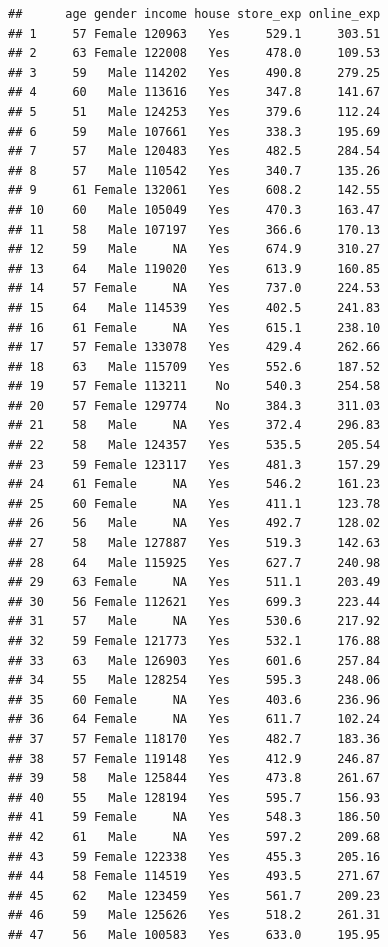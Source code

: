 \documentclass[12pt,]{krantz}
\theoremstyle{definition}
\theoremstyle{definition}
\theoremstyle{definition}
\theoremstyle{remark}
\begin{document}
\begin{verbatim}
##      age gender income house store_exp online_exp
## 1     57 Female 120963   Yes     529.1     303.51
## 2     63 Female 122008   Yes     478.0     109.53
## 3     59   Male 114202   Yes     490.8     279.25
## 4     60   Male 113616   Yes     347.8     141.67
## 5     51   Male 124253   Yes     379.6     112.24
## 6     59   Male 107661   Yes     338.3     195.69
## 7     57   Male 120483   Yes     482.5     284.54
## 8     57   Male 110542   Yes     340.7     135.26
## 9     61 Female 132061   Yes     608.2     142.55
## 10    60   Male 105049   Yes     470.3     163.47
## 11    58   Male 107197   Yes     366.6     170.13
## 12    59   Male     NA   Yes     674.9     310.27
## 13    64   Male 119020   Yes     613.9     160.85
## 14    57 Female     NA   Yes     737.0     224.53
## 15    64   Male 114539   Yes     402.5     241.83
## 16    61 Female     NA   Yes     615.1     238.10
## 17    57 Female 133078   Yes     429.4     262.66
## 18    63   Male 115709   Yes     552.6     187.52
## 19    57 Female 113211    No     540.3     254.58
## 20    57 Female 129774    No     384.3     311.03
## 21    58   Male     NA   Yes     372.4     296.83
## 22    58   Male 124357   Yes     535.5     205.54
## 23    59 Female 123117   Yes     481.3     157.29
## 24    61 Female     NA   Yes     546.2     161.23
## 25    60 Female     NA   Yes     411.1     123.78
## 26    56   Male     NA   Yes     492.7     128.02
## 27    58   Male 127887   Yes     519.3     142.63
## 28    64   Male 115925   Yes     627.7     240.98
## 29    63 Female     NA   Yes     511.1     203.49
## 30    56 Female 112621   Yes     699.3     223.44
## 31    57   Male     NA   Yes     530.6     217.92
## 32    59 Female 121773   Yes     532.1     176.88
## 33    63   Male 126903   Yes     601.6     257.84
## 34    55   Male 128254   Yes     595.3     248.06
## 35    60 Female     NA   Yes     403.6     236.96
## 36    64 Female     NA   Yes     611.7     102.24
## 37    57 Female 118170   Yes     482.7     183.36
## 38    57 Female 119148   Yes     412.9     246.87
## 39    58   Male 125844   Yes     473.8     261.67
## 40    55   Male 128194   Yes     595.7     156.93
## 41    59 Female     NA   Yes     548.3     186.50
## 42    61   Male     NA   Yes     597.2     209.68
## 43    59 Female 122338   Yes     455.3     205.16
## 44    58 Female 114519   Yes     493.5     271.67
## 45    62   Male 123459   Yes     561.7     209.23
## 46    59   Male 125626   Yes     518.2     261.31
## 47    56   Male 100583   Yes     633.0     195.95

\end{verbatim}
\end{document}

